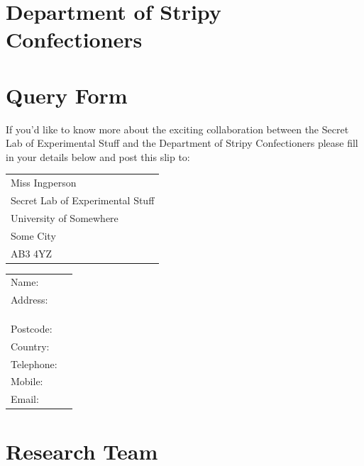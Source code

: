 \documentclass[a4paper,12pt,notumble]{leaflet}
\begin{document}
\section{Department of Stripy Confectioners}


\newpage
\section{Query Form}

If you'd like to know more about the exciting collaboration between
the Secret Lab of Experimental Stuff and the Department of Stripy
Confectioners please fill in your details below and post this slip to:

\bigskip

\begin{tabular}{@{}l}
Miss Ingperson\\
Secret Lab of Experimental Stuff\\
University of Somewhere\\
Some City\\
AB3 4YZ
\end{tabular} 






\begin{tabular}{@{}lp{4cm}}
Name: & \dotfill \\
Address: & \dotfill\\
 & \dotfill \\
 & \dotfill \\
 & \dotfill \\
Postcode: & \dotfill\\
Country: & \dotfill\\
Telephone: & \dotfill\\
Mobile: & \dotfill\\
Email: & \dotfill
\end{tabular}

\newpage

\section{Research Team}
\end{document}
